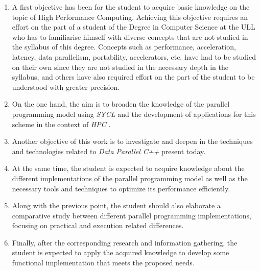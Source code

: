 \begin{enumerate}
\item A first objective has been for the student to acquire basic knowledge on the topic of High Performance Computing. 
Achieving this objective requires an effort on the part of a student of the Degree in Computer Science at the ULL who has to familiarise himself with diverse concepts that are not studied in the syllabus of this degree.
Concepts such as performance, acceleration, latency, data parallelism, portability, accelerators, etc. have had to be studied on their own since they are not studied in the necessary depth in the syllabus, and others have also required effort on the part of the student to be understood with greater precision.

\item On the one hand, the aim is to broaden the knowledge of the parallel programming model using \textit{SYCL} \cite{URL::SYCL} and the development of applications for this scheme in the context of \textit{HPC} \cite{Assiroj:2018:High}.

\item Another objective of this work is to investigate and deepen in the techniques and technologies related to \textit{Data Parallel C++} \cite{Reinders:2023:Data} present today.

\item At the same time, the student is expected to acquire knowledge about the different implementations of the parallel programming model as well as the necessary tools and techniques to optimize its performance efficiently.

\item Along with the previous point, the student should also elaborate a comparative study between different parallel programming implementations, focusing on practical and execution related differences.


\item Finally, after the corresponding research and information gathering, the student is expected to apply the acquired knowledge to develop some functional implementation that meets the proposed needs.
\end{enumerate}